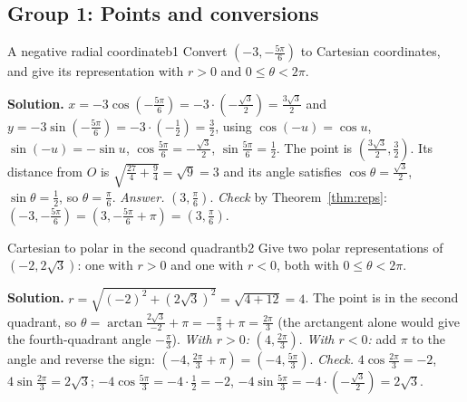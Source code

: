 \documentclass[11pt]{article}
\begin{document}
\subsection*{Group 1: Points and conversions}

\begin{exmp}{A negative radial coordinate}{b1}
Convert $\left(-3,-\frac{5\pi}6\right)$ to Cartesian coordinates, and give its representation with $r>0$ and $0\le\theta<2\pi$.

\textbf{Solution.} $x=-3\cos\left(-\frac{5\pi}6\right)=-3\cdot\left(-\frac{\sqrt3}2\right)=\frac{3\sqrt3}2$ and $y=-3\sin\left(-\frac{5\pi}6\right)=-3\cdot\left(-\frac12\right)=\frac32$, using $\cos(-u)=\cos u$, $\sin(-u)=-\sin u$, $\cos\frac{5\pi}6=-\frac{\sqrt3}2$, $\sin\frac{5\pi}6=\frac12$. The point is $\left(\frac{3\sqrt3}2,\frac32\right)$. Its distance from $O$ is $\sqrt{\frac{27}4+\frac94}=\sqrt9=3$ and its angle satisfies $\cos\theta=\frac{\sqrt3}2$, $\sin\theta=\frac12$, so $\theta=\frac\pi6$. \emph{Answer.} $\left(3,\frac\pi6\right)$. \emph{Check} by Theorem~\ref{thm:reps}: $\left(-3,-\frac{5\pi}6\right)=\left(3,-\frac{5\pi}6+\pi\right)=\left(3,\frac\pi6\right)$.
\end{exmp}

\begin{exmp}{Cartesian to polar in the second quadrant}{b2}
Give two polar representations of $(-2,2\sqrt3)$: one with $r>0$ and one with $r<0$, both with $0\le\theta<2\pi$.

\textbf{Solution.} $r=\sqrt{(-2)^2+(2\sqrt3)^2}=\sqrt{4+12}=4$. The point is in the second quadrant, so $\theta=\arctan\frac{2\sqrt3}{-2}+\pi=-\frac\pi3+\pi=\frac{2\pi}3$ (the arctangent alone would give the fourth-quadrant angle $-\frac\pi3$). \emph{With $r>0$:} $\left(4,\frac{2\pi}3\right)$. \emph{With $r<0$:} add $\pi$ to the angle and reverse the sign: $\left(-4,\frac{2\pi}3+\pi\right)=\left(-4,\frac{5\pi}3\right)$. \emph{Check.} $4\cos\frac{2\pi}3=-2$, $4\sin\frac{2\pi}3=2\sqrt3$; $-4\cos\frac{5\pi}3=-4\cdot\frac12=-2$, $-4\sin\frac{5\pi}3=-4\cdot\left(-\frac{\sqrt3}2\right)=2\sqrt3$.
\end{exmp}
\end{document}
